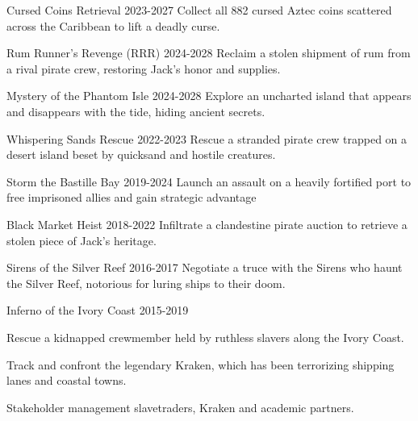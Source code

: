 \begin{cventries}
\cventry
{Cursed Coins Retrieval} %
{}{}
{2023-2027} %
{ %
Collect all 882 cursed Aztec coins scattered across the Caribbean to lift a deadly curse.
}

\cventry
{Rum Runner’s Revenge (RRR)} %
{}{}
{2024-2028} %
{ %
Reclaim a stolen shipment of rum from a rival pirate crew, restoring Jack's honor and supplies.
}

\cventry
{Mystery of the Phantom Isle} %
{}{}
{2024-2028} %
{ %
Explore an uncharted island that appears and disappears with the tide, hiding ancient secrets.
}
\end{cventries}

\begin{cventries}
\cventry
{Whispering Sands Rescue} %
{}{}
{2022-2023} %
{ %
Rescue a stranded pirate crew trapped on a desert island beset by quicksand and hostile creatures.
}

\cventry
{Storm the Bastille Bay} %
{}{}
{2019-2024} %
{ %
Launch an assault on a heavily fortified port to free imprisoned allies and gain strategic advantage
}

\cventry
{Black Market Heist} %
{}{}
{2018-2022} %
{ %
Infiltrate a clandestine pirate auction to retrieve a stolen piece of Jack’s heritage.
}

\cventry
{Sirens of the Silver Reef} %
{}{}
{2016-2017} %
{ %
Negotiate a truce with the Sirens who haunt the Silver Reef, notorious for luring ships to their doom.
}

\cventry
{Inferno of the Ivory Coast} %
{}{}
{2015-2019} %
{ %
\vspace{-4mm}
\begin{cvitemsnested}
    \item {Rescue a kidnapped crewmember held by ruthless slavers along the Ivory Coast.}
    \item {Track and confront the legendary Kraken, which has been terrorizing shipping lanes and coastal towns.} 
    \item {Stakeholder management slavetraders, Kraken and academic partners.}
\end{cvitemsnested}
}

\end{cventries}
